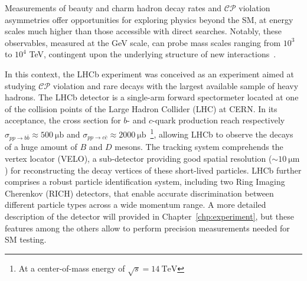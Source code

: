 Measurements of beauty and charm hadron decay rates and $\mathcal{CP}$ violation asymmetries offer opportunities for exploring physics beyond the SM, at energy scales much higher than those accessible with direct searches. Notably, these observables, measured at the GeV scale, can probe mass scales ranging from $10^3$ to $10^4$ TeV, contingent upon the underlying structure of new interactions~\cite{Isidori_2010}. 

In this context, the LHCb experiment was conceived as an experiment aimed at studying $\mathcal{CP}$ violation and rare decays with the largest available sample of heavy hadrons. The LHCb detector is a single-arm forward spectormeter located at one of the collision points of the Large Hadron Collider (LHC) at CERN. In its acceptance, the cross section for $b$- and $c$-quark production reach respectively $\sigma_{pp\rightarrow b\bar{b}}\approx\SI{500}{\micro\barn}$ and $\sigma_{pp\rightarrow c\bar{c}}\approx\SI{2000}{\micro\barn}$~\cite{bCrossSection, Aaij:2057627}\footnote{At a center-of-mass energy of $\sqrt{s}=\SI{14}{\tera\eV}$}, allowing LHCb to observe the decays of a huge amount of $B$ and $D$ mesons. The tracking system comprehends the vertex locator (VELO), a sub-detector providing good spatial resolution ($\sim \SI{10}{\micro\meter}$) for reconstructing the decay vertices of these short-lived particles. LHCb further comprises a robust particle identification system, including two Ring Imaging Cherenkov (RICH) detectors, that enable accurate discrimination between different particle types across a wide momentum range. A more detailed description of the detector will provided in Chapter~\ref{chp:experiment}, but these features among the others allow to perform precision measurements needed for SM testing.


